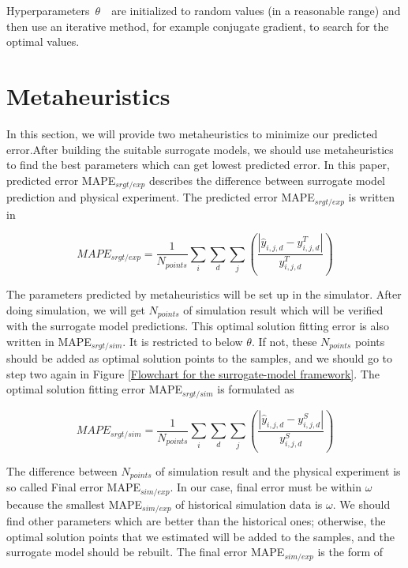 Hyperparameters $\theta$  are initialized to random values (in a reasonable range) and then use an iterative method, for example conjugate gradient, to search for the optimal values.


\section{Metaheuristics}

In this section, we will provide two metaheuristics to minimize our predicted error.After building the suitable surrogate models, we should use metaheuristics to find the best parameters which can get lowest predicted error. In this paper, predicted error MAPE$_{srgt/exp}$ describes the difference between surrogate model prediction and physical experiment. The predicted error MAPE$_{srgt/exp}$ is written in

\begin{equation}
\label{srgt/exp}
MAPE_{srgt/exp}=\frac{1}{N_{points}}\sum_{i}\sum_{d}\sum_{j}\left ( \frac{\left |\hat{y}_{i,j,d}-y_{i,j,d}^T \right |}{y_{i,j,d}^T} \right )
\end{equation}

The parameters predicted by metaheuristics will be set up in the simulator. After doing simulation, we will get $N_{points}$ of simulation result which will be verified with the surrogate model predictions. This optimal solution fitting error is also written in MAPE$_{srgt/sim}$. It is restricted to below $\theta$. If not, these $N_{points}$ points should be added as optimal solution points to the samples, and we should go to step two again in Figure \ref{Flowchart for the surrogate-model framework}. The optimal solution fitting error MAPE$_{srgt/sim}$ is formulated as

\begin{equation}
\label{optimal srgt/sim}
MAPE_{srgt/sim}=\frac{1}{N_{points}}\sum_{i}\sum_{d}\sum_{j}\left ( \frac{\left |\hat{y}_{i,j,d}-y_{i,j,d}^S \right |}{y_{i,j,d}^S} \right )
\end{equation}

The difference between $N_{points}$ of simulation result and the physical experiment is so called Final error MAPE$_{sim/exp}$. In our case, final error must be within $\omega$  because the smallest MAPE$_{sim/exp}$ of historical simulation data is $\omega$. We should find other parameters which are better than the historical ones; otherwise, the optimal solution points that we estimated will be added to the samples, and the surrogate model should be rebuilt. The final error MAPE$_{sim/exp}$ is the form of

